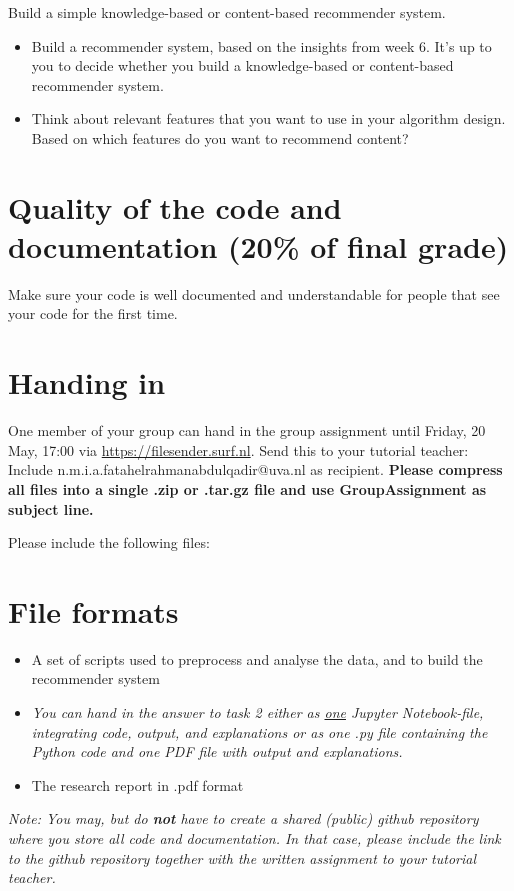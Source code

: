 Build a simple knowledge-based or content-based recommender system. 

\begin{itemize}
\item Build a recommender system, based on the insights from week 6. It's up to you to decide whether you build a knowledge-based or content-based recommender system.
\item Think about relevant features that you want to use in your algorithm design. Based on which features do you want to recommend content?
\end{itemize}

\section{Quality of the code and documentation (20\% of final grade)}

Make sure your code is well documented and understandable for people that see your code for the first time. 

\section{Handing in}
One member of your group can hand in the group assignment until Friday, 20 May, 17:00 via \url{https://filesender.surf.nl}. Send this to your tutorial teacher: Include n.m.i.a.fatahelrahmanabdulqadir@uva.nl as recipient. \textbf{Please compress all files into a single .zip or .tar.gz file and use GroupAssignment as subject line.} 

Please include the following files:   
\section*{File formats}

\begin{itemize}
	\item  A set of scripts used to preprocess and analyse the data, and to build the recommender system
	\item \emph{
		You can hand in the answer to task 2 \emph{either} as \underline{one} Jupyter Notebook-file, integrating code, output, and explanations \emph{or} as one .py file containing the Python code and one PDF file with output and explanations.
	}
	\item The research report in .pdf format
\end{itemize}

\emph{Note: You may, but do \textbf{not} have to create a shared (public) github repository where you store all code and documentation. In that case, please include the link to the github repository together with the written assignment to your tutorial teacher.}


